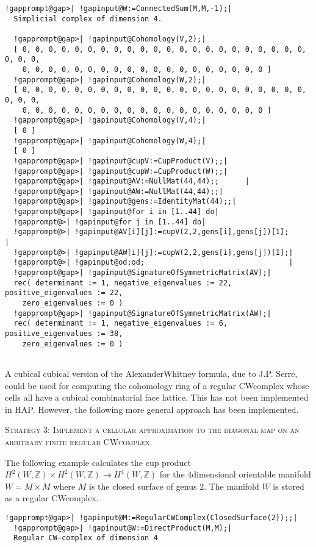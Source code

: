 \documentclass[a4paper,11pt]{report}
\begin{document}
{{\begin{Verbatim}[commandchars=!@|,fontsize=\small,frame=single,label=Example]
  !gapprompt@gap>| !gapinput@W:=ConnectedSum(M,M,-1);|
  Simplicial complex of dimension 4.
  
  !gapprompt@gap>| !gapinput@Cohomology(V,2);|
  [ 0, 0, 0, 0, 0, 0, 0, 0, 0, 0, 0, 0, 0, 0, 0, 0, 0, 0, 0, 0, 0, 0, 0, 0, 0, 
    0, 0, 0, 0, 0, 0, 0, 0, 0, 0, 0, 0, 0, 0, 0, 0, 0, 0, 0 ]
  !gapprompt@gap>| !gapinput@Cohomology(W,2);|
  [ 0, 0, 0, 0, 0, 0, 0, 0, 0, 0, 0, 0, 0, 0, 0, 0, 0, 0, 0, 0, 0, 0, 0, 0, 0, 
    0, 0, 0, 0, 0, 0, 0, 0, 0, 0, 0, 0, 0, 0, 0, 0, 0, 0, 0 ]
  !gapprompt@gap>| !gapinput@Cohomology(V,4);|
  [ 0 ]
  !gapprompt@gap>| !gapinput@Cohomology(W,4);|
  [ 0 ]
  !gapprompt@gap>| !gapinput@cupV:=CupProduct(V);;|
  !gapprompt@gap>| !gapinput@cupW:=CupProduct(W);;|
  !gapprompt@gap>| !gapinput@AV:=NullMat(44,44);;      |
  !gapprompt@gap>| !gapinput@AW:=NullMat(44,44);;|
  !gapprompt@gap>| !gapinput@gens:=IdentityMat(44);;|
  !gapprompt@gap>| !gapinput@for i in [1..44] do|
  !gapprompt@>| !gapinput@for j in [1..44] do|
  !gapprompt@>| !gapinput@AV[i][j]:=cupV(2,2,gens[i],gens[j])[1];                               |
  !gapprompt@>| !gapinput@AW[i][j]:=cupW(2,2,gens[i],gens[j])[1];|
  !gapprompt@>| !gapinput@od;od;                                 |
  !gapprompt@gap>| !gapinput@SignatureOfSymmetricMatrix(AV);|
  rec( determinant := 1, negative_eigenvalues := 22, positive_eigenvalues := 22,
    zero_eigenvalues := 0 )
  !gapprompt@gap>| !gapinput@SignatureOfSymmetricMatrix(AW);|
  rec( determinant := 1, negative_eigenvalues := 6, positive_eigenvalues := 38, 
    zero_eigenvalues := 0 )
  
\end{Verbatim}
 A cubical cubical version of the Alexander\texttt{}Whitney formula,
due to J.\texttt{}P. Serre, could be used for computing the
cohomology ring of a regular CW\texttt{}complex whose cells all
have a cubical combinatorial face lattice. This has not been implemented in
HAP. However, the following more general approach has been implemented. 

\textsc{Strategy 3: Implement a cellular approximation to the diagonal map on an
arbitrary finite regular CW\texttt{}complex.} 

The following example calculates the cup product $H^2(W,\mathbb Z)\times H^2(W,\mathbb Z) \rightarrow H^4(W,\mathbb Z)$ for the $4$\texttt{}dimensional orientable manifold $W=M\times M$ where $M$ is the closed surface of genus $2$. The manifold $W$ is stored as a regular CW\texttt{}complex. 
\begin{Verbatim}[commandchars=!@|,fontsize=\small,frame=single,label=Example]
  !gapprompt@gap>| !gapinput@M:=RegularCWComplex(ClosedSurface(2));;|
  !gapprompt@gap>| !gapinput@W:=DirectProduct(M,M);|
  Regular CW-complex of dimension 4
  

\end{Verbatim}}}
\end{document}
